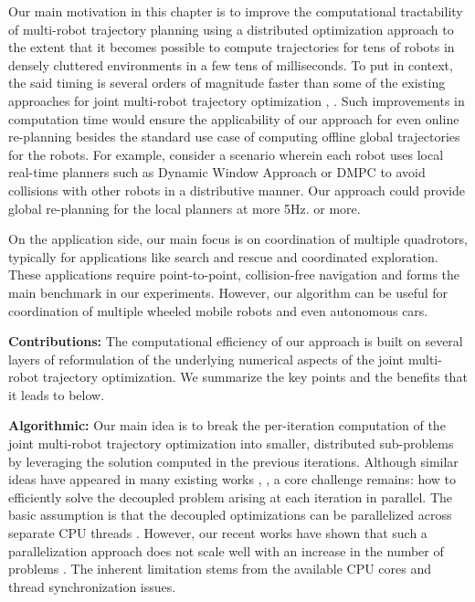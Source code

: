 Our main motivation in this chapter is to improve the computational tractability of multi-robot trajectory planning using a distributed optimization approach to the extent that it becomes possible to compute trajectories for tens of robots in densely cluttered environments in a few tens of milliseconds. To put in context, the said timing is several orders of magnitude faster than some of the existing approaches for joint multi-robot trajectory optimization \citep{rafaella_scp}, \citep{alonso_mora_nips_multi}. Such improvements in computation time would ensure the applicability of our approach for even online re-planning besides the standard use case of computing offline global trajectories for the robots. For example, consider a scenario wherein each robot uses local real-time planners such as Dynamic Window Approach \citep{dwa} or DMPC \citep{dmpc_carlos} to avoid collisions with other robots in a distributive manner. Our approach could provide global re-planning for the local planners at more 5Hz. or more.

On the application side, our main focus is on coordination of multiple quadrotors, typically for applications like search and rescue and coordinated exploration. These applications require point-to-point, collision-free navigation and forms the main benchmark in our experiments. However, our algorithm can be useful for coordination of multiple wheeled mobile robots and even autonomous cars.











\noindent \textbf{Contributions:}
The computational efficiency of our approach is built on several layers of reformulation of the underlying numerical aspects of the joint multi-robot trajectory optimization. We summarize the key points and the benefits that it leads to below.
 
\noindent \textbf{Algorithmic:} Our main idea is to break the per-iteration computation of the joint multi-robot trajectory optimization into smaller, distributed sub-problems by leveraging the solution computed in the previous iterations. Although similar ideas have appeared in many existing works \citep{alonso_mora_nips_multi}, \citep{dmpc_carlos_2}, a core challenge remains: how to efficiently solve the decoupled problem arising at each iteration in parallel. The basic assumption is that the decoupled optimizations can be parallelized across separate CPU threads \citep{alonso_mora_nips_multi}. However, our recent works have shown that such a parallelization approach does not scale well with an increase in the number of problems \citep{aks_behavior_ral22}. The inherent limitation stems from the available CPU cores and thread synchronization issues. 

